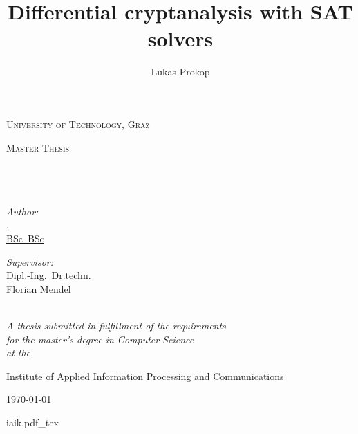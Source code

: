 \documentclass[11pt,a4paper,final,openright]{book}
\author{Lukas Prokop}
\title{Differential cryptanalysis with SAT solvers}
\makeatletter
\theoremstyle{definition}
\newcommand\authormail{admin@lukas-prokop.at}
\newcommand\institute{Institute of Applied Information Processing and Communications}
\newcommand\university{University of Technology, Graz}
\newcommand\supervisor{Florian Mendel}
\makeatother
\begin{document}
\frontmatter
\begin{titlepage}
  \begin{center}
    {\scshape\LARGE \university\par}\vspace{1.2cm}
    \textsc{\Large Master Thesis}\\[0.5cm]

    \hrulefill \\[0.4cm]
    {\huge \bfseries \makeatletter\@title\makeatother\\}\vspace{0.1cm}
    \hrulefill \\[1.5cm]

    \begin{minipage}[t]{0.4\textwidth}
      \begin{flushleft} \large
        \emph{Author:}\\[3pt]
        \href{mailto:\authormail}{\theauthor, \\ BSc~BSc}
      \end{flushleft}
    \end{minipage}
    \begin{minipage}[t]{0.4\textwidth}
      \begin{flushright} \large
        \emph{Supervisor:} \\[3pt]
        {Dipl.-Ing.~Dr.techn. \\ \supervisor}
      \end{flushright}
    \end{minipage}\\[3cm]

    \large \textit{A thesis submitted in fulfillment of the requirements \\ for the master's degree in Computer Science}\\[0.3cm]
    \textit{at the}\\[0.4cm]
    \begin{minipage}{0.4\textwidth}
      \centering
      \institute
    \end{minipage}
    \vspace{2cm}

    {\large \today}\\[2cm]
    \begin{minipage}{0.4\textwidth}
      \centering
      \def\svgwidth{\textwidth}
      {iaik.pdf_tex}
    \end{minipage}

    \vfill
  \end{center}
\end{titlepage}
\end{document}
